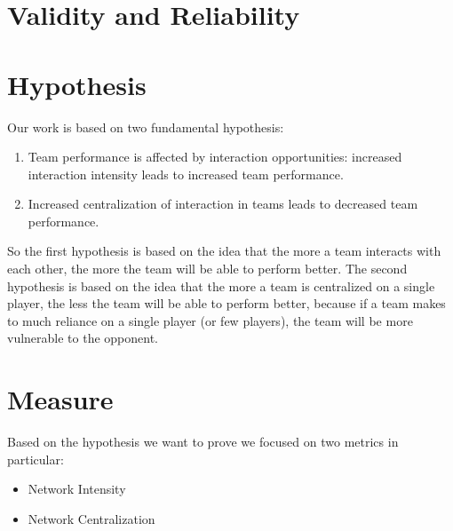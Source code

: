 \documentclass[12pt, a4paper]{article}
\begin{document}
\section{Validity and Reliability }
\label{validity-and-reliability}
 


\section{Hypothesis}
Our work is based on two fundamental hypothesis:
\begin{enumerate}
        \item Team performance is affected by interaction opportunities: increased interaction intensity leads to increased team performance.
        \item Increased centralization of interaction in teams leads to decreased team performance.
\end{enumerate}
So the first hypothesis is based on the idea that the more a team interacts with each other, the more the team will be able to perform better. The second hypothesis is based on the idea that the more a team is centralized on a single player, the less the team will be able to perform better, because if a team makes to much reliance on a single player (or few players), the team will be more vulnerable to the opponent. 
\section{Measure}
\label{measures}
Based on the hypothesis we want to prove we focused on two metrics in particular:
\begin{itemize}
        \item Network Intensity
        \item Network Centralization
\end{itemize}
\end{document}
